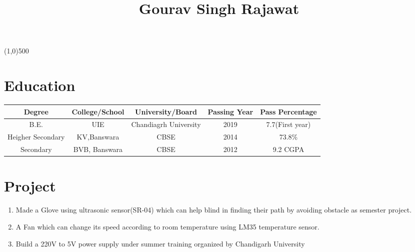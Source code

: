 \documentclass[11pt,a4paper]{article}
\def\sline{

    \vspace{-5.5em}
    \hspace{\fill}\line(1,0){500}\hspace{\fill}
}%
\begin{document}
\title{Gourav Singh Rajawat}%
\author{}
\date{}
\maketitle
\sline  %
\begin{multicols}{2} %
\columnbreak %
\end{multicols} %

\section*{Education} %
\vspace{-0.7em}\hline \vspace{1.5em} %
	\begin{tabular}{|c|c|c|c|c|} %
	\hline %
	Degree & College/School & University/Board & Passing Year & Pass Percentage \\
	\hline
	B.E. &UIE &Chandiagrh University &2019 &7.7(First year) \\
	\hline
	Heigher Secondary &KV,Banswara &CBSE &2014 & 73.8\% \\ \hline
	Secondary &BVB, Banswara &CBSE &2012 &9.2 CGPA \\ \hline
	\end{tabular}	%
	
	
\section*{Project}
\vspace{-0.7em}\hline \vspace{1.5em}
\begin{enumerate} %

\item Made a Glove using ultrasonic sensor(SR-04) which can help blind in finding their path by avoiding obstacle as semester project. 

\item A Fan which can change its speed according to room temperature using LM35 temperature sensor.

\item Build a 220V to 5V power supply under summer training organized by Chandigarh University
\end{enumerate}
\end{document}
